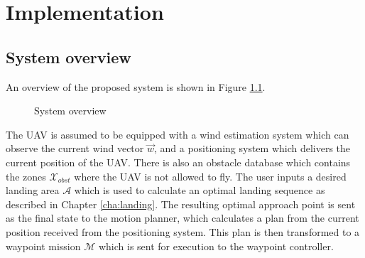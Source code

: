 \chapter{Implementation}\label{cha:implementation}
\section{System overview}
An overview of the proposed system is shown in Figure \ref{fig:sys_overview}.
\begin{figure}
    \begin{center}
    \end{center}
    \caption{System overview}
    \label{fig:sys_overview}
\end{figure}
The UAV is assumed to be equipped with a wind estimation system which can observe the current wind vector $\vec{w}$, and a positioning system which delivers the current position of the UAV. 
There is also an obstacle database which contains the zones $\mathcal{X}_{obst}$ where the UAV is not allowed to fly. The user inputs a desired landing area $\mathcal{A}$ which is 
used to calculate an optimal landing sequence as described in Chapter \ref{cha:landing}. The resulting optimal approach point is sent as the final state to the motion planner, which calculates a plan from the current 
position received from the positioning system. This plan is then transformed to a waypoint mission $\mathcal{M}$ which is sent for execution to the waypoint controller.
